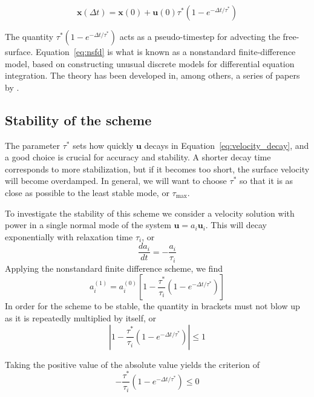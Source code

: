 \documentclass[preprint,12pt,authoryear]{elsarticle}
\newif\ifdetail
\begin{document}
\begin{equation}
\mathbf{x}(\Delta t) = \mathbf{x}(0) + \mathbf{u}(0) \tau^* \left(1-e^{-\Delta t/\tau^*} \right)
\label{eq:nsfd}
\end{equation}

The quantity $\tau^*(1-e^{-\Delta t / \tau^*})$ acts as a pseudo-timestep for advecting the free-surface.
Equation~\eqref{eq:nsfd} is what is known as a nonstandard finite-difference model, based on
constructing unusual discrete models for differential equation integration.
The theory has been developed in, among others, a series of papers by
\citet{mickens1994nonstandard, mickens2002nonstandard, mickens2005dynamic}.

\subsection{Stability of the scheme}
The parameter $\tau^*$ sets how quickly $\mathbf{u}$ decays in Equation~\eqref{eq:velocity_decay}, and a good 
choice is crucial for accuracy and stability. A shorter decay time corresponds to more stabilization,
but if it becomes too short, the surface velocity will become overdamped. In general, we will want 
to choose $\tau^*$ so that it is as close as possible to the least stable mode, or $\tau_{\mathrm{max}}$.

To investigate the stability of this scheme we consider a velocity solution with power in 
a single normal mode of the system $\mathbf{u} = a_i \mathbf{u}_i$.
This will decay exponentially with relaxation time $\tau_i$, or
\begin{equation}
\frac{d a_i} {dt} = - \frac{ a_i }{\tau_i} 
\end{equation}
Applying the nonstandard finite difference scheme, we find
\begin{equation}
a_i^{(1)} = a_i^{(0)} \left[ 1 - \frac{\tau^*}{\tau_i} \left(1-e^{-\Delta t/\tau^*} \right) \right]
\label{eq:recursion}
\end{equation}
In order for the scheme to be stable, the quantity in brackets must not blow up as it is repeatedly 
multiplied by itself, or 
\begin{equation}
\left| 1 - \frac{\tau^*}{\tau_i} \left(1-e^{-\Delta t/\tau^*} \right) \right| \le 1
\end{equation}

\ifdetail
Taking the positive value of the absolute value yields the criterion of 
\begin{equation}
- \frac{\tau^*}{\tau_i} \left(1-e^{-\Delta t/\tau^*} \right) \le 0
\end{equation}
\end{document}
